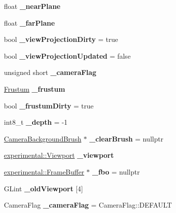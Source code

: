 \begin{DoxyCompactItemize}
float {\bfseries \+\_\+near\+Plane}
\item 
\mbox{\label{classCamera_aec9a1dbadc4a334ae60a38f08399d27c}} 
float {\bfseries \+\_\+far\+Plane}
\item 
\mbox{\label{classCamera_ab9858e9a67f4962b7d9215e574dfc372}} 
bool {\bfseries \+\_\+view\+Projection\+Dirty} = true
\item 
\mbox{\label{classCamera_adba816bb204f717f7a9e18622b782cb0}} 
bool {\bfseries \+\_\+view\+Projection\+Updated} = false
\item 
\mbox{\label{classCamera_a0294a7e6404398b7fe6a39093f4bb3f5}} 
unsigned short {\bfseries \+\_\+camera\+Flag}
\item 
\mbox{\label{classCamera_a93c92d84348d27b186f99124a78025fa}} 
\hyperlink{classFrustum}{Frustum} {\bfseries \+\_\+frustum}
\item 
\mbox{\label{classCamera_a5ab756090414ad599d411b1ea36dd1c0}} 
bool {\bfseries \+\_\+frustum\+Dirty} = true
\item 
\mbox{\label{classCamera_ae9a5ddf9ad54031727f0784e471deee8}} 
int8\+\_\+t {\bfseries \+\_\+depth} = -\/1
\item 
\mbox{\label{classCamera_a4d99b1524c12398c47a01af854eb99aa}} 
\hyperlink{classCameraBackgroundBrush}{Camera\+Background\+Brush} $\ast$ {\bfseries \+\_\+clear\+Brush} = nullptr
\item 
\mbox{\label{classCamera_a7ca71bbfb8aac6c7343163ef5a651f5a}} 
\hyperlink{structexperimental_1_1Viewport}{experimental\+::\+Viewport} {\bfseries \+\_\+viewport}
\item 
\mbox{\label{classCamera_aa3f2ea39a66f03fa0a2bb337f6a93748}} 
\hyperlink{classexperimental_1_1FrameBuffer}{experimental\+::\+Frame\+Buffer} $\ast$ {\bfseries \+\_\+fbo} = nullptr
\item 
\mbox{\label{classCamera_a43344c99f8b31e611ffb1e8f3c66b7d2}} 
G\+Lint {\bfseries \+\_\+old\+Viewport} \mbox{[}4\mbox{]}
\item 
\mbox{\label{classCamera_a4bd3e12e9c03ca99fcbd63d92c7e56cd}} 
Camera\+Flag {\bfseries \+\_\+camera\+Flag} = Camera\+Flag\+::\+D\+E\+F\+A\+U\+LT
\end{DoxyCompactItemize}
